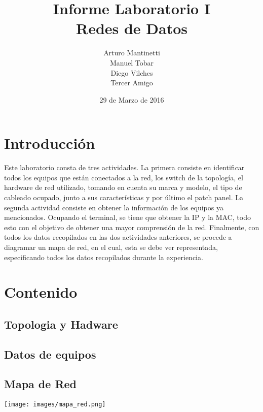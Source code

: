 \documentclass[spanish]{udpreport}
\title{Informe Laboratorio I \\ Redes de Datos}
\author{Arturo Mantinetti \\ Manuel Tobar \\ Diego Vilches \\ Tercer Amigo}
\date{29 de Marzo de 2016}
\begin{document}
\maketitle

\tableofcontents

\chapter{Introducción}

Este laboratorio consta de tres actividades. La primera consiste en identificar todos los equipos que están conectados a la red, los switch de la topología, el hardware de red utilizado, tomando en cuenta su marca y modelo, el tipo de cableado ocupado, junto a sus características y por último el patch panel. La segunda actividad consiste en obtener la información de los equipos ya mencionados. Ocupando el terminal, se tiene que obtener la IP y la MAC, todo esto con el objetivo de obtener una mayor comprensión de la red. Finalmente, con todos los datos recopilados en las dos actividades anteriores, se procede a diagramar un mapa de red, en el cual, esta se debe ver representada,  especificando todos los datos recopilados durante la experiencia.


\chapter{Contenido}

\section{Topologia y Hadware}

\section{Datos de equipos}


\pagebreak
\section{Mapa de Red}

\begin{center}
	\texttt{[image: images/mapa\_red.png]} 
\end{center}

\listoffigures
\end{document}
